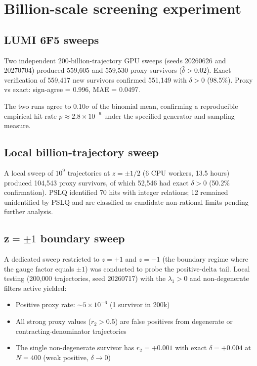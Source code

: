 \documentclass[11pt]{article}
\begin{document}
\section{Billion-scale screening experiment}
\label{sec:sweeps}

\subsection{LUMI 6F5 sweeps}

Two independent 200-billion-trajectory GPU sweeps (seeds 20260626 and 20270704) produced 559{,}605 and 559{,}530 proxy survivors ($\hat\delta > 0.02$). Exact verification of 559{,}417 new survivors confirmed 551{,}149 with $\delta > 0$ (98.5\%). Proxy vs exact: sign-agree = 0.996, MAE = 0.0497.

The two runs agree to $0.10\sigma$ of the binomial mean, confirming a reproducible empirical hit rate $p \approx 2.8 \times 10^{-6}$ under the specified generator and sampling measure.

\subsection{Local billion-trajectory sweep}

A local sweep of $10^9$ trajectories at $z = \pm 1/2$ (6 CPU workers, 13.5 hours) produced 104{,}543 proxy survivors, of which 52{,}546 had exact $\delta > 0$ (50.2\% confirmation). PSLQ identified 70 hits with integer relations; 12 remained unidentified by PSLQ and are classified as candidate non-rational limits pending further analysis.

\subsection{z$=\pm 1$ boundary sweep}

A dedicated sweep restricted to $z = +1$ and $z = -1$ (the boundary regime where the gauge factor equals $\pm 1$) was conducted to probe the positive-delta tail. Local testing (200{,}000 trajectories, seed 20260717) with the $\lambda_1 > 0$ and non-degenerate filters active yielded:

\begin{itemize}
\item Positive proxy rate: $\sim 5 \times 10^{-6}$ (1 survivor in 200k)
\item All strong proxy values ($r_2 > 0.5$) are false positives from degenerate or contracting-denominator trajectories
\item The single non-degenerate survivor has $r_2 = +0.001$ with exact $\delta = +0.004$ at $N=400$ (weak positive, $\delta \to 0$)
\end{itemize}
\end{document}

